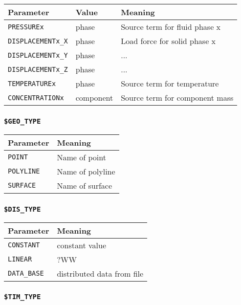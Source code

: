 \begin{tabular*}{12.773cm}{|p{}|p{1.5cm}|p{7cm}|} \hline
Parameter          & Value & Meaning \\ \hline \hline
%
\texttt{PRESSUREx}        & phase & Source term for fluid phase x \\
\texttt{DISPLACEMENTx\_X} & phase & Load force for solid phase x \\
\texttt{DISPLACEMENTx\_Y} & phase & ... \\
\texttt{DISPLACEMENTx\_Z} & phase & ... \\
\texttt{TEMPERATUREx}     & phase & Source term for temperature \\
\texttt{CONCENTRATIONx}   & component & Source term for component mass \\
\hline
\end{tabular*}

\subsubsection{\texttt{\$GEO\_TYPE}}

\begin{tabular*}{12.773cm}{|p{}|p{8.9cm}|} \hline
Parameter          & Meaning \\ \hline \hline
%
\texttt{POINT}     & Name of point \\
\texttt{POLYLINE}  & Name of polyline \\
\texttt{SURFACE}   & Name of surface \\
\hline
\end{tabular*}

\subsubsection{\texttt{\$DIS\_TYPE}}

\begin{tabular*}{12.773cm}{|p{}|p{8.9cm}|} \hline
Parameter           & Meaning \\ \hline \hline
%
\texttt{CONSTANT}   & constant value \\
\texttt{LINEAR}     & ?WW \\
\texttt{DATA\_BASE} & distributed data from file \\
\hline
\end{tabular*}

\subsubsection{\texttt{\$TIM\_TYPE}}

